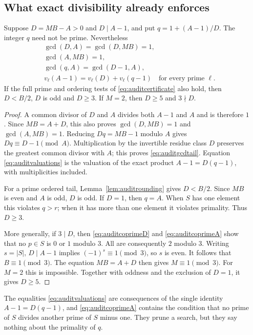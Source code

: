 \subsection{What exact divisibility already enforces}
\begin{proposition}
\label{prop:auditconsequences}
Suppose $D=MB-A>0$ and $D\mid A-1$, and put $q=1+(A-1)/D$.
The integer $q$ need not be prime. Nevertheless
\begin{align}
 &\gcd(D,A)=\gcd(D,MB)=1,\label{eq:auditcoprimeD}\\
 &\gcd(A,MB)=1,\label{eq:auditcoprimeA}\\
 &\gcd(q,A)=\gcd(D-1,A),\label{eq:auditgcdtail}\\
 &v_\ell(A-1)=v_\ell(D)+v_\ell(q-1)
 \quad\text{for every prime }\ell.\label{eq:auditvaluations}
\end{align}
If the full prime and ordering tests of
\eqref{eq:auditcertificate} also hold, then $D<B/2$, $D$ is odd and
$D\ge3$. If $M=2$, then $D\ge5$ and $3\nmid D$.
\end{proposition}
\begin{proof}
A common divisor of $D$ and $A$ divides both $A-1$ and $A$ and is
therefore $1$. Since $MB=A+D$, this also proves
$\gcd(D,MB)=1$ and $\gcd(A,MB)=1$. Reducing $Dq=MB-1$ modulo
$A$ gives $Dq\equiv D-1\pmod A$. Multiplication by the invertible
residue class $D$ preserves the greatest common divisor with $A$;
this proves \eqref{eq:auditgcdtail}. Equation
\eqref{eq:auditvaluations} is the valuation of the exact product
$A-1=D(q-1)$, with multiplicities included.

For a prime ordered tail, Lemma~\ref{lem:auditrounding} gives
$D<B/2$. Since $MB$ is even and $A$ is odd, $D$ is odd. If $D=1$,
then $q=A$. When $S$ has one element this violates $q>r$; when it
has more than one element it violates primality. Thus $D\ge3$.

More generally, if $3\mid D$, then \eqref{eq:auditcoprimeD} and
\eqref{eq:auditcoprimeA} show that no $p\in S$ is $0$ or $1$
modulo $3$. All are consequently $2$ modulo $3$. Writing $s=|S|$,
$D\mid A-1$ implies $(-1)^s\equiv1\pmod3$, so $s$ is even.
It follows that $B\equiv1\pmod3$. The equation $MB=A+D$ then
gives $M\equiv1\pmod3$. For $M=2$ this is impossible. Together
with oddness and the exclusion of $D=1$, it gives $D\ge5$.
\end{proof}

The equalities \eqref{eq:auditvaluations} are consequences of the
single identity $A-1=D(q-1)$, and \eqref{eq:auditcoprimeA} contains
the condition that no prime of $S$ divides another prime of $S$ minus
one. They prune a search, but they say nothing about the primality of
$q$.

